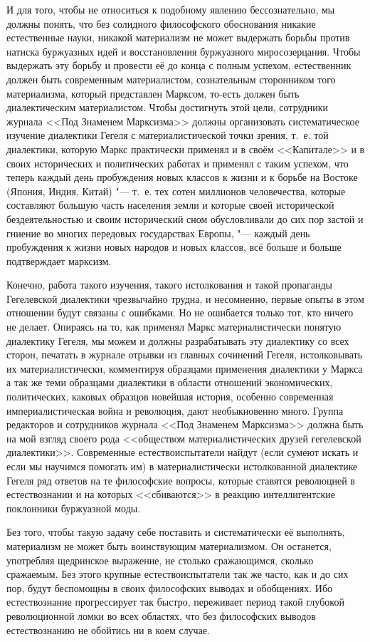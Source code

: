 И для того, чтобы не относиться к подобному явлению бессознательно, мы
должны понять, что без солидного философского обоснования никакие
естественные науки, никакой материализм не может выдержать борьбы против
натиска буржуазных идей и восстановления буржуазного миросозерцания. Чтобы
выдержать эту борьбу и провести её до конца с полным успехом, естественник
должен быть современным материалистом, сознательным сторонником того
материализма, который представлен Марксом, то-есть должен быть
диалектическим материалистом. Чтобы достигнуть этой цели, сотрудники
журнала <<Под Знаменем Марксизма>> должны организовать систематическое
изучение диалектики Гегеля с материалистической точки зрения, т.~е. той
диалектики, которую Маркс практически применял и в своём <<Капитале>> и в
своих исторических и политических работах и применял с таким успехом, что
теперь каждый день пробуждения новых классов к жизни и к борьбе на Востоке
(Япония, Индия, Китай) "--- т.~е. тех сотен миллионов человечества, которые
составляют большую часть населения земли и которые своей исторической
бездеятельностью и своим исторический сном обусловливали до сих пор застой
и гниение во многих передовых государствах Европы, "--- каждый день
пробуждения к жизни новых народов и новых классов, всё больше и больше
подтверждает марксизм.

Конечно, работа такого изучения, такого истолкования и такой пропаганды
Гегелевской диалектики чрезвычайно трудна, и несомненно, первые опыты в
этом отношении будут связаны с ошибками. Но не ошибается только тот, кто
ничего не делает. Опираясь на то, как применял Маркс материалистически
понятую диалектику Гегеля, мы можем и должны разрабатывать эту диалектику
со всех сторон, печатать в журнале отрывки из главных сочинений Гегеля,
истолковывать их материалистически, комментируя образцами применения
диалектики у Маркса а так же теми образцами диалектики в области отношений
экономических, политических, каковых образцов новейшая история, особенно
современная империалистическая война и революция, дают необыкновенно много.
Группа редакторов и сотрудников журнала <<Под Знаменем Марксизма>> должна
быть на мой взгляд своего рода <<обществом материалистических друзей
гегелевской диалектики>>. Современные естествоиспытатели найдут (если сумеют
искать и если мы научимся помогать им) в материалистически истолкованной
диалектике Гегеля ряд ответов на те философские вопросы, которые ставятся
революцией в естествознании и на которых <<сбиваются>> в реакцию
интеллигентские поклонники буржуазной моды.

Без того, чтобы такую задачу себе поставить и систематически её выполнять,
материализм не может быть воинствующим материализмом. Он останется,
употребляя щедринское выражение, не столько сражающимся, сколько сражаемым.
Без этого крупные естествоиспытатели так же часто, как и до сих пор, будут
беспомощны в своих философских выводах и обобщениях. Ибо естествознание
прогрессирует так быстро, переживает период такой глубокой революционной
ломки во всех областях, что без философских выводов естествознанию не
обойтись ни в коем случае.

